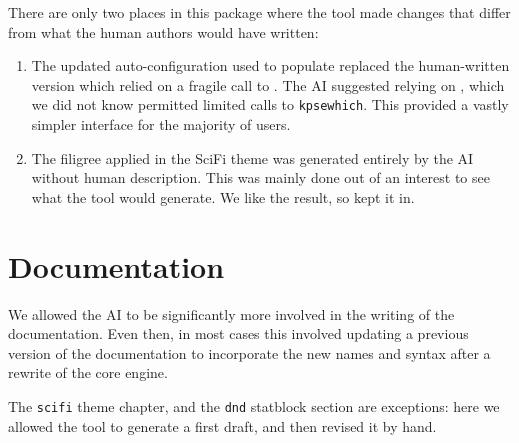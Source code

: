 		There are only two places in this package where the tool made changes that differ from what the human authors would have written:

		\begin{enumerate}
			\item The updated auto-configuration used to populate  replaced the human-written version which relied on a fragile call to . The AI suggested relying on , which we did not know permitted limited calls to \texttt{kpsewhich}. This provided a vastly simpler interface for the majority of users.
			\item The filigree applied in the SciFi theme was generated entirely by the AI without human description. This was mainly done out of an interest to see what the tool would generate. We like the result, so kept it in.
		\end{enumerate}
	\section*{Documentation}

		We allowed the AI to be significantly more involved in the writing of the documentation. Even then, in most cases this involved updating a previous version of the documentation to incorporate the new names and syntax after a rewrite of the core engine.

		The \texttt{scifi} theme chapter, and the \texttt{dnd} statblock section are exceptions: here we allowed the tool to generate a first draft, and then revised it by hand.

